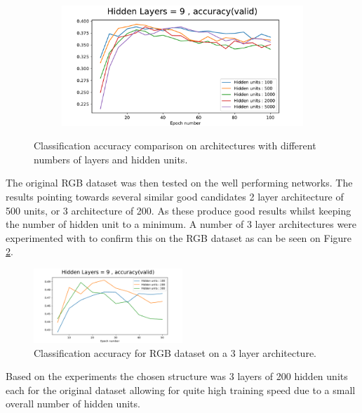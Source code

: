 \documentclass[12pt]{article}
\begin{document}
\begin{figure}[ht!]
\begin{subfigure}[t]{0.475\textwidth}
    \end{subfigure}
    ~
    \begin{subfigure}[t]{0.475\textwidth}
        \centering
        \includegraphics[width=1.0\linewidth]{hidden_units_layers_10_accuracy(valid).pdf}
    \end{subfigure}
    \caption{Classification accuracy comparison on architectures with different numbers of layers and hidden units. }
    \label{fig:arch}
\end{figure}

The original RGB dataset was then tested on the well performing networks. The results pointing towards several similar good candidates 2 layer architecture of 500 units, or 3 architecture of 200. As these produce good results whilst keeping the number of hidden unit to a minimum. A number of 3 layer architectures were experimented with to confirm this on the RGB dataset as can be seen on Figure \ref{fig:arch2}.

\begin{figure}[H]
\centering
\includegraphics[width=0.5\textwidth]{hidden_units_layers_4_accuracy(valid)_orig.pdf}

  \caption{Classification accuracy for RGB dataset on a 3 layer architecture.}
  \label{fig:arch2}
\end{figure}

Based on the experiments the chosen structure was 3 layers of 200 hidden units each for the original dataset allowing for quite high training speed due to a small overall number of hidden units.
\end{document}
